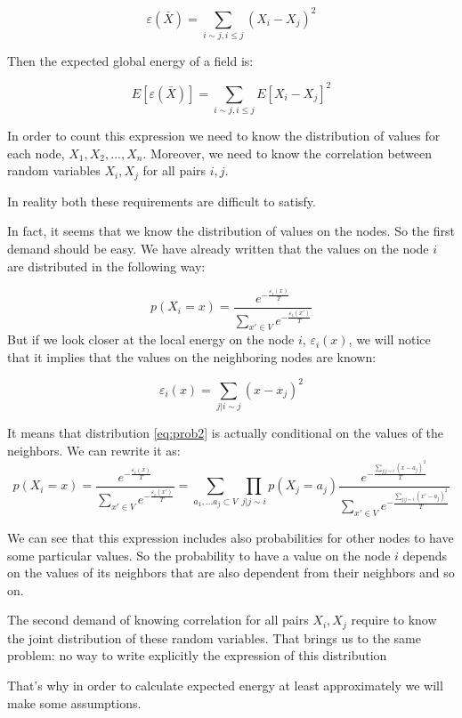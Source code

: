 \documentclass[12pt]{report}
\begin{document}
$$ \varepsilon (\bar{X}) =  \sum_{i \sim j, i \leq j} (X_i - X_j)^2  $$

Then the expected global energy of a field is:

$$ E[\varepsilon (\bar{X})] =  \sum_{i \sim j, i \leq j} E[X_i - X_j]^2  $$

In order to count this expression we need to know the distribution of values for each node, $X_1, X_2, ..., X_n$. Moreover, we need to know the correlation between random variables $X_i, X_j$ for all pairs  $i, j$.

In reality both these requirements are difficult to satisfy.

In fact, it seems that we know the distribution of values on the nodes. So the first demand should be easy. We have already written that the values on the node $i$ are distributed in the following way:

\begin{equation}
\label{eq:prob2} 
p(X_i = x) = \frac{ e^{-\frac{\varepsilon_i(x)}{T}} }{ \sum\limits_{x'\in V} e^{-\frac{\varepsilon_i(x')}{T}}}
\end{equation}
But if we look closer at the local energy on the node $i$, $\varepsilon_i(x)$, we will notice that it implies that the values on the neighboring nodes are known:

 $$\varepsilon_i(x) = \sum\limits_{j | i \sim j} (x - x_j)^2 $$
  
It means that distribution \ref{eq:prob2} is actually conditional on the values of the neighbors. We can rewrite it as:
$$ p(X_i = x) = \frac{ e^{-\frac{\varepsilon_i(x)}{T}} }{ \sum\limits_{x'\in V} e^{-\frac{\varepsilon_i(x')}{T}}}  = 
\sum\limits_{a_1, ... a_j \subset V} \prod\limits_{j|j \sim i} p(X_j  = a_j)
\frac{ e^{-\frac{ \sum\limits_{j|j \sim i}(x - a_j)^2 }{T}} }{ \sum\limits_{x'\in V} e^{-\frac{ \sum\limits_{j|j \sim i}(x' - a_j)^2 }{T}}}  $$

We can see that this expression includes also probabilities for other nodes to have some particular values. So the probability to have a value on the node $i$ depends on the values of its neighbors that are also dependent from their neighbors and so on.

The second demand of knowing correlation for all pairs $X_i, X_j$ require to know the joint distribution of these random variables. That brings us to the same problem: no way to write explicitly the expression of this distribution

That's why in order to calculate expected energy at least approximately we will make some assumptions.
\end{document}
